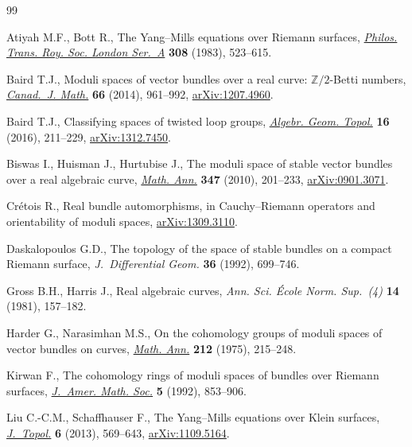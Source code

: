 \documentclass[pdftex]{sigma}
\numberwithin{equation}{section}
\begin{document}
\begin{thebibliography}{99}
\footnotesize\itemsep=0pt

Atiyah M.F., Bott R., The {Y}ang--{M}ills equations over {R}iemann surfaces,
 \href{http://dx.doi.org/10.1098/rsta.1983.0017}{\textit{Philos. Trans. Roy. Soc. London Ser.~A}} \textbf{308} (1983),
 523--615.

Baird T.J., Moduli spaces of vector bundles over a real curve:
 {$\mathbb{Z}/2$}-{B}etti numbers, \href{http://dx.doi.org/10.4153/CJM-2013-049-1}{\textit{Canad.~J. Math.}} \textbf{66}
 (2014), 961--992, \href{http://arxiv.org/abs/1207.4960}{arXiv:1207.4960}.

Baird T.J., Classifying spaces of twisted loop groups, \href{http://dx.doi.org/10.2140/agt.2016.16.211}{\textit{Algebr. Geom.
 Topol.}} \textbf{16} (2016), 211--229, \href{http://arxiv.org/abs/1312.7450}{arXiv:1312.7450}.

Biswas I., Huisman J., Hurtubise J., The moduli space of stable vector bundles
 over a real algebraic curve, \href{http://dx.doi.org/10.1007/s00208-009-0442-5}{\textit{Math. Ann.}} \textbf{347} (2010),
 201--233, \href{http://arxiv.org/abs/0901.3071}{arXiv:0901.3071}.

Cr{\'e}tois R., Real bundle automorphisms, in {C}auchy--{R}iemann operators and
 orientability of moduli spaces, \href{http://arxiv.org/abs/1309.3110}{arXiv:1309.3110}.

Daskalopoulos G.D., The topology of the space of stable bundles on a compact
 {R}iemann surface, \textit{J.~Diffe\-ren\-tial Geom.} \textbf{36} (1992),
 699--746.

Gross B.H., Harris J., Real algebraic curves, \textit{Ann. Sci. \'Ecole Norm.
 Sup.~(4)} \textbf{14} (1981), 157--182.

Harder G., Narasimhan M.S., On the cohomology groups of moduli spaces of vector
 bundles on curves, \href{http://dx.doi.org/10.1007/BF01357141}{\textit{Math. Ann.}} \textbf{212} (1975), 215--248.

Kirwan F., The cohomology rings of moduli spaces of bundles over {R}iemann
 surfaces, \href{http://dx.doi.org/10.2307/2152712}{\textit{J.~Amer. Math. Soc.}} \textbf{5} (1992), 853--906.

Liu C.-C.M., Schaf\/fhauser F., The {Y}ang--{M}ills equations over {K}lein
 surfaces, \href{http://dx.doi.org/10.1112/jtopol/jtt001}{\textit{J.~Topol.}} \textbf{6} (2013), 569--643, \href{http://arxiv.org/abs/1109.5164}{arXiv:1109.5164}.


\end{thebibliography}
\end{document}
